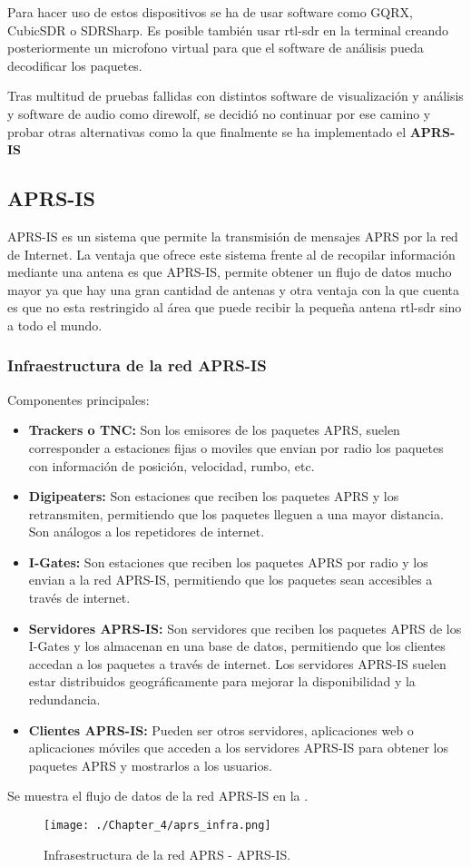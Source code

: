 Para hacer uso de estos dispositivos se ha de usar software como GQRX, CubicSDR o SDRSharp. Es posible también usar rtl-sdr en la terminal creando posteriormente un microfono virtual para que el software de análisis pueda decodificar los paquetes.

Tras multitud de pruebas fallidas con distintos software de visualización y análisis y software de audio como direwolf, se decidió no continuar por ese camino y probar otras alternativas como la que finalmente se ha implementado el \textbf{APRS-IS} 

\subsection{APRS-IS}
APRS-IS es un sistema que permite la transmisión de mensajes APRS por la red de Internet. La ventaja que ofrece este sistema frente al de recopilar información mediante una antena es que APRS-IS, permite obtener un flujo de datos mucho mayor ya que hay una gran cantidad de antenas y otra ventaja con la que cuenta es que no esta restringido al área que puede recibir la pequeña antena rtl-sdr sino a todo el mundo.

\subsubsection{Infraestructura de la red APRS-IS}
Componentes principales:
\begin{itemize}
	\item \textbf{Trackers o TNC:} Son los emisores de los paquetes APRS, suelen corresponder a estaciones fijas o moviles que envian por radio los paquetes con información de posición, velocidad, rumbo, etc.
	\item \textbf{Digipeaters:} Son estaciones que reciben los paquetes APRS y los retransmiten, permitiendo que los paquetes lleguen a una mayor distancia. Son análogos a los repetidores de internet.
	\item \textbf{I-Gates:} Son estaciones que reciben los paquetes APRS por radio y los envian a la red APRS-IS, permitiendo que los paquetes sean accesibles a través de internet.
	\item \textbf{Servidores APRS-IS:} Son servidores que reciben los paquetes APRS de los I-Gates y los almacenan en una base de datos, permitiendo que los clientes accedan a los paquetes a través de internet. Los servidores APRS-IS suelen estar distribuidos geográficamente para mejorar la disponibilidad y la redundancia.
	\item \textbf{Clientes APRS-IS:} Pueden ser otros servidores, aplicaciones web o aplicaciones móviles que acceden a los servidores APRS-IS para obtener los paquetes APRS y mostrarlos a los usuarios. 
\end{itemize}
Se muestra el flujo de datos de la red APRS-IS en la .
\begin{figure}[h]
	\centering 
	\texttt{[image: ./Chapter\_4/aprs\_infra.png]}
	\caption{Infrasestructura de la red APRS - APRS-IS.}
	\label{fig:aprs-infra}
\end{figure}

